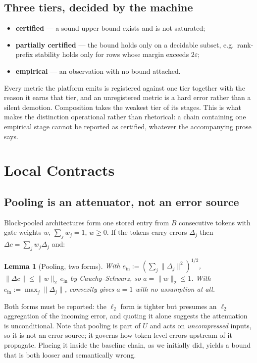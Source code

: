 \documentclass[11pt]{article}
\newtheorem{lemma}{Lemma}
\begin{document}
\subsection{Three tiers, decided by the machine}
\label{sec:tiers}
\begin{itemize}
\item \textbf{certified} --- a sound upper bound exists and is not saturated;
\item \textbf{partially certified} --- the bound holds only on a decidable subset,
      e.g.\ rank-prefix stability holds only for rows whose margin exceeds
      $2\varepsilon$;
\item \textbf{empirical} --- an observation with no bound attached.
\end{itemize}
Every metric the platform emits is registered against one tier together with the
reason it earns that tier, and an unregistered metric is a hard error rather than a
silent demotion. Composition takes the weakest tier of its stages. This is what
makes the distinction operational rather than rhetorical: a chain containing one
empirical stage cannot be reported as certified, whatever the accompanying prose
says.

\section{Local Contracts}
\label{sec:local}

\subsection{Pooling is an attenuator, not an error source}
Block-pooled architectures form one stored entry from $B$ consecutive tokens with
gate weights $w$, $\sum_j w_j=1$, $w\ge 0$. If the tokens carry errors $\Delta_j$
then $\Delta c=\sum_j w_j\Delta_j$ and:

\begin{lemma}[Pooling, two forms]\label{lem:pool}
With $e_{\mathrm{in}}:=(\sum_j\lVert\Delta_j\rVert^2)^{1/2}$,
$\lVert\Delta c\rVert\le\lVert w\rVert_2\,e_{\mathrm{in}}$ by Cauchy--Schwarz, so
$a=\lVert w\rVert_2\le 1$. With $e_{\mathrm{in}}:=\max_j\lVert\Delta_j\rVert$,
convexity gives $a=1$ with no assumption at all.
\end{lemma}

Both forms must be reported: the $\ell_2$ form is tighter but presumes an $\ell_2$
aggregation of the incoming error, and quoting it alone suggests the attenuation is
unconditional. Note that pooling is part of $U$ and acts on \emph{uncompressed}
inputs, so it is not an error source; it governs how token-level errors upstream of
it propagate. Placing it inside the baseline chain, as we initially did, yields a
bound that is both looser and semantically wrong.
\end{document}
